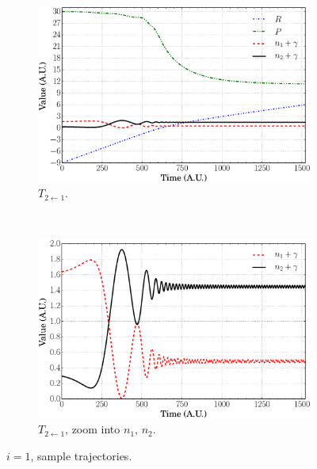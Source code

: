 \documentclass[xetex,mathserif,serif]{beamer}
\newcommand{\tto}{$ T_{2\leftarrow1} $}
\begin{document}
\begin{frame}
{\begin{figure}
\begin{subfigure}[t]{0.45\textwidth}
\includegraphics[width=\textwidth]{ec_traj_t21.eps}
\vspace{-0.1cm}
\caption{{\fontsize{7}{8}\selectfont \tto.}}
\end{subfigure}
~
\begin{subfigure}[t]{0.45\textwidth}
\centering
\includegraphics[width=\textwidth]{ec_traj_t21_e.eps}
\vspace{-0.1cm}
\caption{{\fontsize{7}{8}\selectfont \tto, zoom into $ n_{1}$, $n_{2} $.}}
\end{subfigure}
\vspace{-0.1cm}
\caption{$ i = 1 $, sample trajectories.}
\end{figure}
}{}


\end{frame}
\end{document}
